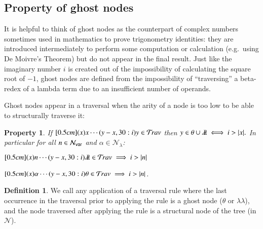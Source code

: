 \documentclass{elsarticle}
\theoremstyle{plain}
\newtheorem{property}[theorem]{Property}
\theoremstyle{definition}
\newtheorem{definition}{Definition}[section]
\theoremstyle{remark}
\newcommand\Nodes{\mathcal{N}}%
\newcommand\NodesVar{\Nodes_{\sf var}}%
\newcommand\NodesLmd{\Nodes_\lambda}%
\newcommand{\ghostlmd}{{\lambda\!\!\lambda}}
\newcommand{\ghostvar}{\theta}
\newcommand{\travulc}{\travset}
\begin{document}
\subsection{Property of ghost nodes}

It is helpful to think of ghost nodes as the counterpart of complex numbers sometimes used in mathematics
to prove trigonometry identities: they are introduced intermediately to perform some computation or calculation (e.g.\ using De Moivre's Theorem) but do not appear in the final result. Just like the imaginary number $i$ is created out of the impossibility of calculating the square root of $-1$, ghost nodes are defined from the impossibility of ``traversing'' a beta-redex of a lambda term due to an insufficient number of operands.


Ghost nodes appear in a traversal when the arity of a node is too low to be able to structurally traverse it:
\begin{property}
\label{prop:ghost_justifier_arity}
If $\Pstr[0.5cm]{(x){x} \cdots (y-x,30:i){y}} \in \travulc$ then
$ y \in \ghostvar \union \ghostlmd \iff i > |x|.$
In particular for all $n\in\NodesVar$ and $\alpha\in\NodesLmd$:
\begin{enumerate*}[nosep,label=(\roman*)]
\item $\Pstr[0.5cm]{(x){n} \cdots (y-x,30:i){\ghostlmd}} \in \travulc \implies i > |n|$
\item $\Pstr[0.5cm]{(x){\alpha} \cdots (y-x,30:i){\ghostvar}} \in \travulc \implies i > |n|$.
\end{enumerate*}
\end{property}

\begin{definition}
We call  any application of a traversal rule where the last occurrence in the traversal prior to applying the rule is a ghost node ($\ghostvar$ or $\ghostlmd$), and the node traversed after applying the rule is a structural node of the tree (in $\Nodes$).
\end{definition}
\end{document}
